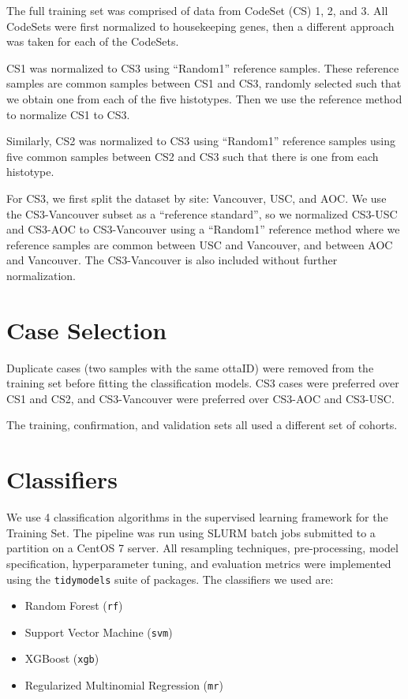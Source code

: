 \documentclass[
]{report}
\providecommand{\tightlist}{%
  \setlength{\itemsep}{0pt}\setlength{\parskip}{0pt}}
\begin{document}
The full training set was comprised of data from CodeSet (CS) 1, 2, and 3. All CodeSets were first normalized to housekeeping genes, then a different approach was taken for each of the CodeSets.

CS1 was normalized to CS3 using ``Random1'' reference samples. These reference samples are common samples between CS1 and CS3, randomly selected such that we obtain one from each of the five histotypes. Then we use the reference method to normalize CS1 to CS3.

Similarly, CS2 was normalized to CS3 using ``Random1'' reference samples using five common samples between CS2 and CS3 such that there is one from each histotype.

For CS3, we first split the dataset by site: Vancouver, USC, and AOC. We use the CS3-Vancouver subset as a ``reference standard'', so we normalized CS3-USC and CS3-AOC to CS3-Vancouver using a ``Random1'' reference method where we reference samples are common between USC and Vancouver, and between AOC and Vancouver. The CS3-Vancouver is also included without further normalization.

\hypertarget{case-selection}{%
\section{Case Selection}\label{case-selection}}

Duplicate cases (two samples with the same ottaID) were removed from the training set before fitting the classification models. CS3 cases were preferred over CS1 and CS2, and CS3-Vancouver were preferred over CS3-AOC and CS3-USC.

The training, confirmation, and validation sets all used a different set of cohorts.

\hypertarget{classifiers}{%
\section{Classifiers}\label{classifiers}}

We use 4 classification algorithms in the supervised learning framework for the Training Set. The pipeline was run using SLURM batch jobs submitted to a partition on a CentOS 7 server. All resampling techniques, pre-processing, model specification, hyperparameter tuning, and evaluation metrics were implemented using the \texttt{tidymodels} suite of packages. The classifiers we used are:

\begin{itemize}
\tightlist
\item
  Random Forest (\texttt{rf})
\item
  Support Vector Machine (\texttt{svm})
\item
  XGBoost (\texttt{xgb})
\item
  Regularized Multinomial Regression (\texttt{mr})
\end{itemize}
\end{document}
